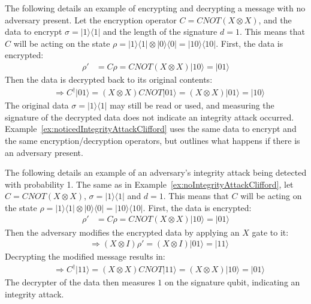\begin{example}
\label{ex:noIntegrityAttackClifford}
	The following details an example of encrypting and decrypting a message with no adversary present. Let the encryption operator $C = \mathit{CNOT}(X \otimes X)$, and the data to encrypt $\sigma = |1\rangle\langle1|$ and the length of the signature $d = 1$. This means that $C$ will be acting on the state $\rho = |1\rangle\langle1| \otimes |0\rangle\langle0| = |10\rangle\langle10|$. First, the data is encrypted:
	\begin{align}
	\rho' &= C\rho = \mathit{CNOT}(X \otimes X)|10\rangle = |01\rangle
	\end{align}
	Then the data is decrypted back to its original contents:
	\begin{align}
	& \Rightarrow C^{\dagger}|01\rangle = (X \otimes X)\mathit{CNOT}|01\rangle = (X \otimes X)|01\rangle = |10\rangle
	\end{align}
	The original data $\sigma = |1\rangle\langle1|$ may still be read or used, and measuring the signature of the decrypted data does not indicate an integrity attack occurred. Example~\ref{ex:noticedIntegrityAttackClifford} uses the same data to encrypt and the same encryption/decryption operators, but outlines what happens if there is an adversary present.
\end{example}

\begin{example}
\label{ex:noticedIntegrityAttackClifford}
	The following details an example of an adversary's integrity attack being detected with probability 1. The same as in Example~\ref{ex:noIntegrityAttackClifford}, let $C = \mathit{CNOT}(X \otimes X)$, $\sigma = |1\rangle\langle1|$ and $d = 1$. This means that $C$ will be acting on the state $\rho = |1\rangle\langle1| \otimes |0\rangle\langle0| = |10\rangle\langle10|$. First, the data is encrypted:
	\begin{align}
	\rho' &= C\rho = \mathit{CNOT}(X \otimes X)|10\rangle = |01\rangle
	\end{align}
    Then the adversary modifies the encrypted data by applying an $X$ gate to it:
	\begin{align}
	& \Rightarrow (X \otimes I) \rho' = (X \otimes I) |01\rangle = |11\rangle \label{eq:adversaryNotAttack}
	\end{align}
	Decrypting the modified message results in:
    \begin{align}
	& \Rightarrow C^{\dagger}|11\rangle = (X \otimes X)\mathit{CNOT}|11\rangle = (X \otimes X)|10\rangle = |01\rangle
	\end{align}
	The decrypter of the data then measures $1$ on the signature qubit, indicating an integrity attack. 
\end{example}

